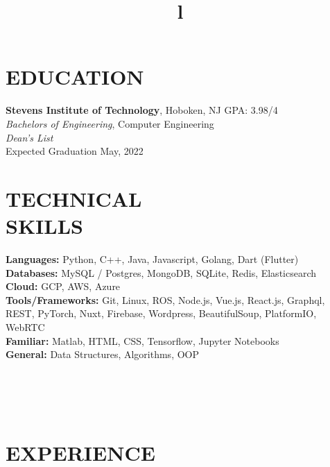 \documentclass[margin]{res}
\begin{document}
\begin{resume}


\section{EDUCATION}
\textbf{Stevens Institute of Technology}, Hoboken, NJ \hfill GPA: 3.98/4\\
{\sl Bachelors of Engineering}, Computer Engineering\\
{\sl Dean's List}\\
Expected Graduation May, 2022

\section{TECHNICAL\\SKILLS}

\textbf{Languages:} Python, C++, Java, Javascript, Golang, Dart (Flutter)
\\
\textbf{Databases:} MySQL / Postgres, MongoDB, SQLite, Redis, Elasticsearch
\\
\textbf{Cloud:} GCP, AWS, Azure
\\
\textbf{Tools/Frameworks:} Git, Linux, ROS, Node.js, Vue.js, React.js, Graphql, REST,
PyTorch, Nuxt, Firebase, Wordpress, BeautifulSoup, PlatformIO, WebRTC
\\
\textbf{Familiar:} Matlab, HTML, CSS, Tensorflow, Jupyter Notebooks
\\
\textbf{General:} Data Structures, Algorithms, OOP

\begin{format}
\title{l}\\
\\
\body\\
\end{format}

\section{EXPERIENCE}


\end{resume}
\end{document}
